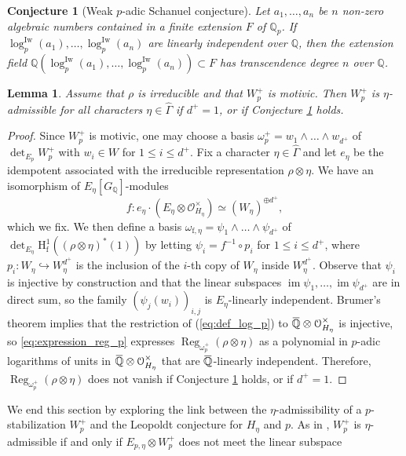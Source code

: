 \documentclass[12pt]{amsart}
\newcommand\bQ{\mathbb{Q}}
\newcommand\Qp{{\mathbb{Q}_p}}
\newcommand\cO{\mathcal{O}}
\newcommand{\ob}[1]{\mkern 1.5mu\overline{\mkern-1.5mu#1\mkern-1.5mu}\mkern 1.5mu}
\DeclareMathOperator{\im}{im}
\DeclareMathOperator{\Reg}{Reg}
\newcommand{\HH}{\mathrm{H}}
\newcommand{\ff}{\mathrm{f}}
\newcommand{\Iw}{\mathrm{Iw}}
\theoremstyle{defstyle}
\theoremstyle{thmstyle}
\newtheorem{lemme}[subsubsection]{Lemma}
\newtheorem{conjecture}[subsubsection]{Conjecture}
\begin{document}
\begin{conjecture}[Weak $p$-adic Schanuel conjecture]\label{conj:schanuel}
	Let $a_1,\ldots,a_n$ be $n$ non-zero algebraic numbers contained in a finite extension $F$ of $\Qp$. If $\log_p^\Iw(a_1),\ldots,\log_p^\Iw(a_n)$ are linearly independent over $\bQ$, then the extension field $\bQ(\log_p^\Iw(a_1),\ldots,\log_p^\Iw(a_n))\subset F$ has transcendence degree $n$ over $\bQ$.
\end{conjecture}

\begin{lemme}\label{lem:schanuel+motivic_implies_admissible}
	Assume that $\rho$ is irreducible and that $W_p^+$ is motivic. Then $W_p^+$ is $\eta$-admissible for all characters $\eta\in\widehat{\Gamma}$ if $d^+=1$, or if Conjecture \ref{conj:schanuel} holds.
\end{lemme}
\begin{proof}
	 Since $W_p^+$ is motivic, one may choose a basis $\omega_p^+=w_1\wedge \ldots \wedge w_{d^+}$ of $\det_{E_p} W_p^+$ with $w_i\in W$ for $1\leq i \leq d^+$. Fix a character $\eta\in\widehat{\Gamma}$ and let $e_\eta$ be the idempotent associated with the irreducible representation $\rho\otimes\eta$. We have an isomorphism of $E_\eta[G_{\bQ}]$-modules
	 \[f \colon e_\eta \cdot\left(E_\eta \otimes \cO_{H_\eta}^\times \right) \simeq (W_\eta)^{\oplus d^+},\]
	 which we fix. We then define a basis $\omega_{\ff,\eta}=\psi_1\wedge\ldots\wedge\psi_{{d^+}}$ of $\det_{E_\eta}\HH^1_\ff((\rho\otimes\eta)^*(1))$ by letting $\psi_i = f^{-1}\circ p_i$ for $1\leq i \leq d^+$, where $p_i\colon W_\eta \hookrightarrow W_\eta^{d^+}$ is the inclusion of the $i$-th copy of $ W_\eta$ inside $W_\eta^{d^+}$. Observe that $\psi_i$ is injective by construction and that the linear subspaces $\im \psi_1,\ldots,\im \psi_{d^+}$ are in direct sum, so the family $(\psi_j(w_i))_{i,j}$ is $E_\eta$-linearly independent. Brumer's theorem \cite{brumer} implies that the restriction of (\ref{eq:def_log_p}) to $\ob{\bQ} \otimes \cO_{H_\eta}^\times$ is injective, so \eqref{eq:expression_reg_p} expresses $\Reg_{\omega_p^+}(\rho\otimes\eta)$ as a polynomial in  $p$-adic logarithms of  units in $\ob{\bQ} \otimes \cO_{H_\eta}^\times$ that are $\ob{\bQ}$-linearly independent. Therefore, $\Reg_{\omega_p^+}(\rho\otimes\eta)$ does not vanish if Conjecture \ref{conj:schanuel} holds, or if $d^+=1$.
\end{proof}
We end this section by exploring the link between the $\eta$-admissibility of a $p$-stabilization $W_p^+$ and the Leopoldt conjecture for $H_\eta$ and $p$. As in \cite[Prop. 2.9(ii)]{maksouddimitrov}, $W_p^+$ is $\eta$-admissible if and only if $E_{p,\eta}\otimes W_p^+$ does not meet the linear subspace 
\end{document}
